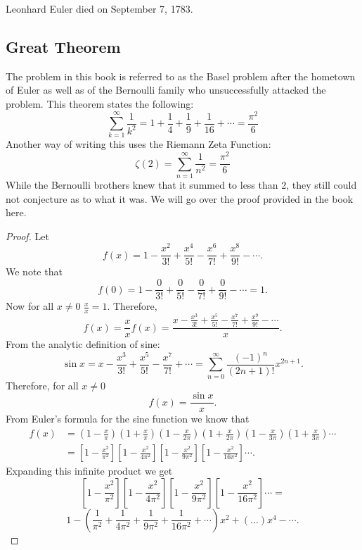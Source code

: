 \documentclass[12pt]{article}
\begin{document}
\begin{doublespace}
Leonhard Euler died on September 7, 1783.
%
\subsection*{Great Theorem}
The problem in this book is referred to as the Basel problem after the hometown of Euler as well as of the Bernoulli family who unsuccessfully attacked the problem.\cite{weil_number_1984}
%
This theorem states the following:
%
\[\displaystyle \sum\limits_{k=1}^\infty \frac{1}{k^2}=1+\frac{1}{4}+\frac{1}{9}+\frac{1}{16}+\cdots=\frac{\pi^2}{6}\]
%
Another way of writing this uses the Riemann Zeta Function:\cite{knuth_art_1997}
%
\[\displaystyle \zeta \left({2}\right) = \sum_{n \mathop = 1}^{\infty} {\frac 1 {n^2}} = \frac {\pi^2} 6\]
%
While the Bernoulli brothers knew that it summed to less than 2, they still could not conjecture as to what it was. We will go over the proof provided in the book here.
%
\begin{proof}
Let 
\[f(x) = 1-\frac{x^2}{3!}+\frac{x^4}{5!}-\frac{x^6}{7!}+\frac{x^8}{9!}-\cdots.\]
We note that 
\[f(0)=1-\frac{0}{3!}+\frac{0}{5!}-\frac{0}{7!}+\frac{0}{9!}-\cdots = 1.\]
Now for all $x\neq 0$ $\frac{x}{x}=1$. Therefore,
\[ f(x) = \frac{x}{x}f(x)=\frac{x-\frac{x^3}{3!}+\frac{x^5}{5!}-\frac{x^7}{7!}+\frac{x^9}{9!}-\cdots}{x}.\]
From the analytic definition of sine:
\[ \sin x = x - \frac{x^3}{3!} + \frac{x^5}{5!} - \frac{x^7}{7!} + \cdots = \sum_{n=0}^\infty \frac{(-1)^n}{(2n+1)!}x^{2n+1}.\]
Therefore, for all $x\neq 0$
\[f(x)=\frac{\sin x}{x}.\]
From Euler's formula for the sine function we know that
\begin{align*}
f(x) &= \left( 1 - \frac{x}{\pi} \right)  \left( 1 + \frac{x}{\pi} \right)  \left( 1 - \frac{x}{2\pi} \right)  \left( 1 + \frac{x}{2\pi} \right)  \left( 1 - \frac{x}{3\pi} \right)  \left( 1 + \frac{x}{3\pi} \right) \cdots \\ 
&= \left[ 1 - \frac{x^2}{\pi^2} \right]  \left[ 1 - \frac{x^2}{4\pi^2} \right]  \left[ 1 - \frac{x^2}{9\pi^2} \right]  \left[ 1 - \frac{x^2}{16\pi^2} \right]\cdots.
\end{align*}
Expanding this infinite product we get
\[\left[ 1 - \frac{x^2}{\pi^2} \right]  \left[ 1 - \frac{x^2}{4\pi^2} \right]  \left[ 1 - \frac{x^2}{9\pi^2} \right]  \left[ 1 - \frac{x^2}{16\pi^2} \right]\cdots =\]
\[1 - \left( \frac{1}{\pi^2} + \frac{1}{4\pi^2} + \frac{1}{9\pi^2} + \frac{1}{16\pi^2} + \cdots \right)x^2 + \left(\dots\right)x^4-\cdots.\]

\end{proof}
\end{doublespace}
\end{document}
